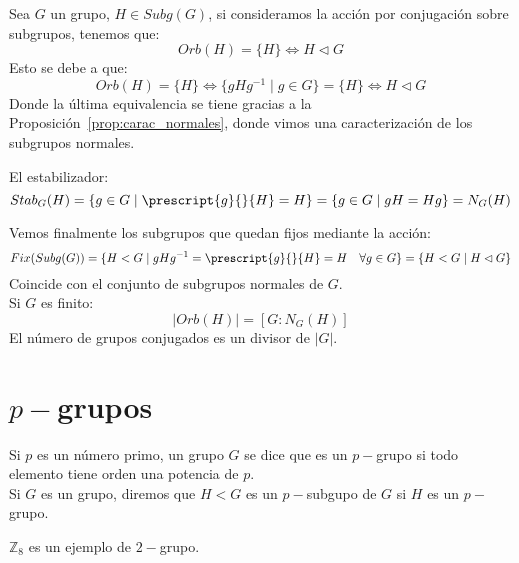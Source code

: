 \begin{observacion}
    Sea $G$ un grupo, $H\in Subg(G)$, si consideramos la acción por conjugación sobre subgrupos, tenemos que:
    \begin{equation*}
        Orb(H) = \{H\} \Longleftrightarrow H\lhd G
    \end{equation*}
    Esto se debe a que:
    \begin{equation*}
        Orb(H) = \{H\} \Longleftrightarrow \{gHg^{-1}\mid g\in G\} = \{H\} \Longleftrightarrow H \lhd G
    \end{equation*}
    Donde la última equivalencia se tiene gracias a la Proposición~\ref{prop:carac_normales}, donde vimos una caracterización de los subgrupos normales.
\end{observacion}
El estabilizador:
\begin{equation*}
    Stab_G(H) = \{g\in G \mid \prescript{g}{}{H} = H\} = \{g\in G \mid gH = Hg\} = N_G(H)
\end{equation*}

Vemos finalmente los subgrupos que quedan fijos mediante la acción:
\begin{equation*}
    Fix(Subg(G)) = \{H < G \mid gHg^{-1} = \prescript{g}{}{H} = H \quad \forall g\in G\} = \{H< G \mid H\lhd G\}
\end{equation*}
Coincide con el conjunto de subgrupos normales de $G$.\\

Si $G$ es finito:
\begin{equation*}
    |Orb(H)| = [G:N_G(H)]
\end{equation*}
El número de grupos conjugados es un divisor de $|G|$.

\section{$p-$grupos}
\begin{definicion}[$p-$grupo]
    Si $p$ es un número primo, un grupo $G$ se dice que es un $p-$grupo si todo elemento tiene orden una potencia de $p$.\\
    
    \noindent
    Si $G$ es un grupo, diremos que $H<G$ es un $p-$subgupo de $G$ si $H$ es un $p-$grupo.
\end{definicion}

\begin{ejemplo}
    $\mathbb{Z}_8$ es un ejemplo de $2-$grupo.
\end{ejemplo}


